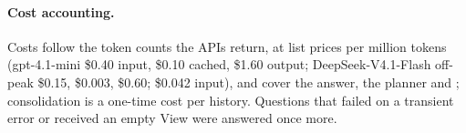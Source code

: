 \paragraph{Cost accounting.}
Costs follow the token counts the APIs return, at list prices per million tokens (gpt-4.1-mini \$0.40 input, \$0.10 cached, \$1.60 output; DeepSeek-V4.1-Flash off-peak \$0.15, \$0.003, \$0.60; \jev{} \$0.042 input), and cover the answer, the planner and \jev; consolidation is a one-time cost per history.
Questions that failed on a transient error or received an empty View were answered once more.
